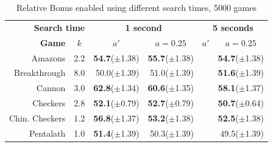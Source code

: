 \documentclass{ecai2014}
\begin{document}
\begin{table}
{\caption{Relative Bonus enabled using different search times, 5000 games} \label{tab:rb}}
\begin{center}
\begin{tabular}{rlrrrr}
\hline
\multicolumn{2}{r}{\rule{0pt}{12pt}\textbf{Search time}} & \multicolumn{2}{c}{\textbf{1 second}} & \multicolumn{2}{c}{\textbf{5 seconds}} \\
\cline{1-6}
\rule{0pt}{12pt}
\textbf{Game} & \multicolumn{1}{c|}{\textbf{$k$}} 
& \multicolumn{1}{c}{\textbf{$a'$}} & \multicolumn{1}{c}{\textbf{$a = 0.25$}} & \multicolumn{1}{c}{\textbf{$a'$}} & \multicolumn{1}{c}{\textbf{$a = 0.25$}} \\ \hline
Amazons &\multicolumn{1}{l|}{2.2}			& {\bf{54.7}}($\pm$1.38) & {\bf{55.7}}($\pm$1.38) 	& & {\bf{54.7}}($\pm$1.38) \\ 
Breakthrough &\multicolumn{1}{l|}{8.0} 		& 50.0($\pm$1.39)		 & 51.0($\pm$1.39) 			& & {\bf{51.6}}($\pm$1.39) \\ 
Cannon &\multicolumn{1}{l|}{3.0} 			& {\bf{62.8}}($\pm$1.34) & {\bf{60.6}}($\pm$1.35) 	& & {\bf{58.1}}($\pm$1.37) \\ 
Checkers &\multicolumn{1}{l|}{2.8}			& {\bf{52.1}}($\pm$0.79) & {\bf{52.7}}($\pm$0.79) 	& & {\bf{50.7}}($\pm$0.64) \\ 
Chin. Checkers &\multicolumn{1}{l|}{1.2} 	& {\bf{56.8}}($\pm$1.37) & {\bf{53.2}}($\pm$1.38) 	& & {\bf{52.5}}($\pm$1.38) \\
Pentalath &\multicolumn{1}{l|}{1.0} 		& {\bf{51.4}}($\pm$1.39) & 50.3($\pm$1.39) 			& & 49.5($\pm$1.39) \\
\hline
\end{tabular}
\end{center}
\end{table}
\end{document}
